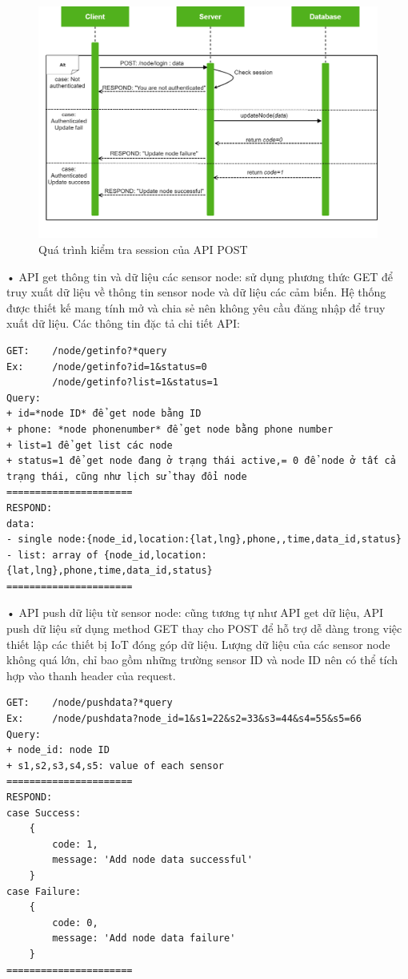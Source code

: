 \begin{figure}[H]
	\centering    
	\includegraphics[width=1\textwidth]{apipost}
	\caption[Quá trình kiểm tra session của API POST]{Quá trình kiểm tra session của API POST}
	\label{fig: apipost}
\end{figure}

• API get thông tin và dữ liệu các sensor node: sử dụng phương thức GET để truy xuất dữ liệu về thông tin sensor node và dữ liệu các cảm biến. Hệ thống được thiết kế mang tính mở và chia sẻ nên không yêu cầu đăng nhập để truy xuất dữ liệu. Các thông tin đặc tả chi tiết API:
\begin{Verbatim}[xleftmargin=2em]
GET:	/node/getinfo?*query
Ex: 	/node/getinfo?id=1&status=0
	    /node/getinfo?list=1&status=1
Query:
+ id=*node ID* để get node bằng ID
+ phone: *node phonenumber* để get node bằng phone number
+ list=1 để get list các node
+ status=1 để get node đang ở trạng thái active,= 0 để node ở tất cả 
trạng thái, cũng như lịch sử thay đổi node
======================
RESPOND:
data:
- single node:{node_id,location:{lat,lng},phone,,time,data_id,status}
- list: array of {node_id,location:{lat,lng},phone,time,data_id,status}
======================
\end{Verbatim}

• API push dữ liệu từ sensor node: cũng tương tự như API get dữ liệu, API push dữ liệu sử dụng method GET thay cho POST để hỗ trợ dễ dàng trong việc thiết lập các thiết bị IoT đóng góp dữ liệu. Lượng dữ liệu của các sensor node không quá lớn, chỉ bao gồm những trường sensor ID và node ID nên có thể tích hợp vào thanh header của request.

\begin{Verbatim}[xleftmargin=2em]
GET: 	/node/pushdata?*query
Ex: 	/node/pushdata?node_id=1&s1=22&s2=33&s3=44&s4=55&s5=66
Query:
+ node_id: node ID
+ s1,s2,s3,s4,s5: value of each sensor
======================
RESPOND:
case Success:
	{
		code: 1,
		message: 'Add node data successful'
	}
case Failure:	
	{
		code: 0,
		message: 'Add node data failure'
	}
======================
\end{Verbatim}

